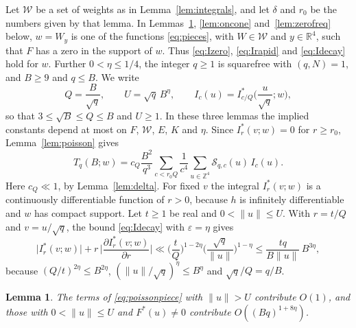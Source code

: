 \documentclass[11pt]{amsart}
\numberwithin{equation}{section}
\numberwithin{figure}{section}
\newtheorem{lemma}{Lemma}[section]
\theoremstyle{definition}
\newcommand{\Z}{\mathbb{Z}}
\newcommand{\R}{\mathbb{R}}
\newcommand{\eps}{\varepsilon}
\newcommand{\abs}[1]{\lvert #1\rvert}
\begin{document}
Let $\mathcal W$ be a set of weights as in Lemma~\ref{lem:integrals},
and let $\delta$ and $r_0$ be the numbers given by that lemma. In
Lemmas~\ref{lem:offcone}, \ref{lem:oncone} and~\ref{lem:zerofreq}
below, $w=W_y$ is one of the functions \eqref{eq:pieces}, with
$W\in\mathcal W$ and $y\in\R^4$, such that $F$ has a zero in the
support of $w$. Thus \eqref{eq:Izero}, \eqref{eq:Irapid} and
\eqref{eq:Idecay} hold for $w$. Further $0<\eta\le1/4$, the integer
$q\ge1$ is squarefree with $(q,N)=1$, and $B\ge9$ and $q\le B$. We
write
\[
 Q=\frac B{\sqrt q},\qquad U=\sqrt q\,B^\eta,\qquad
 I_c(u)=I_{c/Q}^*\Big(\frac u{\sqrt q};w\Big),
\]
so that $3\le\sqrt B\le Q\le B$ and $U\ge1$. In these three lemmas
the implied constants depend at most on $F$, $\mathcal W$, $E$, $K$
and $\eta$. Since $I_r^*(v;w)=0$ for $r\ge r_0$,
Lemma~\ref{lem:poisson} gives
\begin{equation}\label{eq:poissonpiece}
 T_q(B;w)=c_Q\frac{B^2}{q^3}\sum_{c<r_0Q}\frac1{c^4}\sum_{u\in\Z^4}
 \mathcal S_{q,c}(u)\,I_c(u).
\end{equation}
Here $c_Q\ll1$, by Lemma~\ref{lem:delta}. For fixed $v$ the integral
$I_r^*(v;w)$ is a continuously differentiable function of $r>0$,
because $h$ is infinitely differentiable and $w$ has compact support.
Let $t\ge1$ be real and $0<\lVert u\rVert\le U$. With $r=t/Q$ and
$v=u/\sqrt q$, the bound \eqref{eq:Idecay} with $\eps=\eta$ gives
\begin{equation}\label{eq:Ipiece}
 \abs{I_r^*(v;w)}+r\,\bigg|\frac{\partial I_r^*(v;w)}{\partial r}\bigg|
 \ll\Big(\frac tQ\Big)^{1-2\eta}
 \bigg(\frac{\sqrt q}{\lVert u\rVert}\bigg)^{1-\eta}
 \le\frac{tq}{B\lVert u\rVert}\,B^{3\eta},
\end{equation}
because $(Q/t)^{2\eta}\le B^{2\eta}$,
$(\lVert u\rVert/\sqrt q)^\eta\le B^\eta$ and $\sqrt q/Q=q/B$.

\begin{lemma}\label{lem:offcone}
The terms of \eqref{eq:poissonpiece} with $\lVert u\rVert>U$
contribute $O(1)$, and those with $0<\lVert u\rVert\le U$ and
$F^*(u)\ne0$ contribute $O((Bq)^{1+8\eta})$.
\end{lemma}
\end{document}
